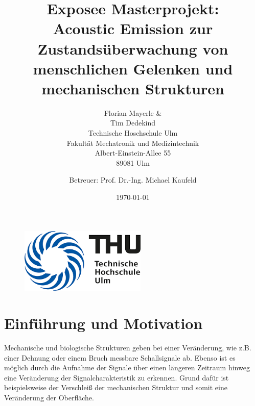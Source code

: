 \documentclass[twoside, 12pt, a4paper]{article}
\title{ \textbf{ Exposee Masterprojekt:}\\ \vspace{2cm} Acoustic Emission zur Zustands\"uberwachung von menschlichen Gelenken und mechanischen Strukturen}
\author{Florian Mayerle \& \\
	Tim Dedekind \\
	Technische Hoschschule Ulm \\
	Fakult\"at Mechatronik und Medizintechnik\\
	Albert-Einstein-Allee 55\\
	89081 Ulm  \\
	\and 
	Betreuer: Prof. Dr.-Ing. Michael Kaufeld  \\
	
}
\date{\today}
\begin{document}
	
	\setlength\parindent{0pt}
	
	\begin{figure}
		\centering
		
		\includegraphics[width=6cm,keepaspectratio]{Images/THU}
	\end{figure}
	
	\maketitle
	
	\newpage
	\fancyhf{}
	\fancyhead[RO,LE]{\rightmark}
	\fancyfoot[RO,LE]{\thepage}
	
	\newpage
	\setcounter{page}{1}
	\tableofcontents
	\listoffigures
	\newpage
	
	\section{Einf\"uhrung und Motivation}
	
	
	Mechanische und biologische Strukturen geben bei einer Ver\"anderung, wie z.B. einer Dehnung oder einem Bruch messbare Schallsignale ab. Ebenso ist es m\"oglich durch die Aufnahme der Signale \"uber einen l\"angeren Zeitraum hinweg eine Ver\"anderung der Signalcharakteristik zu erkennen. Grund daf\"ur ist beispielsweise der Verschlei{\ss} der mechanischen Struktur und somit eine Ver\"anderung der Oberfl\"ache.\\     
	
\end{document}
